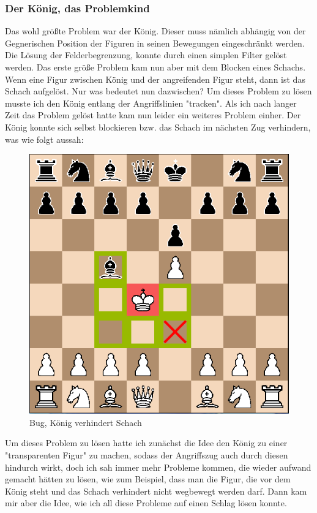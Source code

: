 \documentclass[a4paper, 10pt]{scrartcl}
\begin{document}
\subsubsection{Der König, das Problemkind}
Das wohl größte Problem war der König. Dieser muss nämlich abhängig von der Gegnerischen Position der Figuren
in seinen Bewegungen eingeschränkt werden. Die Lösung der Felderbegrenzung, konnte durch einen simplen Filter gelöst werden. Das erste größe Problem kam nun aber mit dem
Blocken eines Schachs. Wenn eine Figur zwischen König und der angreifenden Figur steht, dann ist das Schach aufgelöst. Nur was bedeutet nun dazwischen?
Um dieses Problem zu lösen musste ich den König entlang der Angriffslinien "tracken". Als ich nach langer Zeit das Problem gelöst hatte kam nun leider ein weiteres Problem einher. 
Der König konnte sich selbst blockieren bzw. das Schach im nächsten Zug verhindern, was wie folgt aussah: 
\begin{figure}[h]
\centering
\includegraphics[scale=0.6]{assets/Bug_king_blocking.png}
\caption{Bug, König verhindert Schach}
\end{figure}

Um dieses Problem zu lösen hatte ich zunächst die Idee den König zu einer "transparenten
Figur" zu machen, sodass der Angriffszug auch durch diesen hindurch wirkt, doch ich sah immer
mehr Probleme kommen, die wieder aufwand gemacht hätten zu lösen, wie zum Beispiel, dass man die 
Figur, die vor dem König steht und das Schach verhindert nicht wegbewegt werden darf. Dann kam mir
aber die Idee, wie ich all diese Probleme auf einen Schlag lösen konnte.
\end{document}
